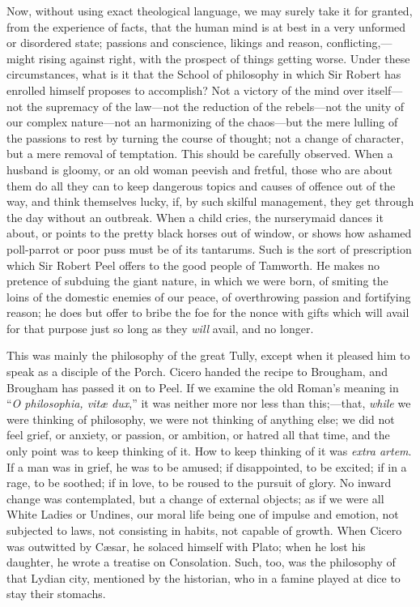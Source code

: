 Now, without using exact theological language, we may surely take
it for granted, from the experience of facts, that the human mind is
at best in a very unformed or disordered state; passions and
conscience, likings and reason, conflicting,—might rising against
right, with the prospect of things getting worse. Under these
circumstances, what is it that the School of philosophy in which
Sir Robert has enrolled himself proposes to accomplish? Not a victory
of the mind over itself—not the supremacy of the law—not the
reduction of the rebels—not the unity of our complex nature—not an
harmonizing of the chaos—but the mere lulling of the passions to
rest by turning the course of thought; not a change of character, but
a mere removal of temptation. This should be carefully observed. When
a husband is gloomy, or an old woman peevish and fretful, those who
are about them do all they can to keep dangerous topics and causes of
offence out of the way, and think themselves lucky, if, by such
skilful management, they get through the day without an outbreak. When
a child cries, the nurserymaid dances it about, or points to the
pretty black horses out of window, or shows how ashamed poll-parrot or
poor puss must be of its tantarums. Such is the sort of prescription
which Sir Robert Peel offers to the good people of Tamworth. He makes
no pretence of subduing the giant nature, in which we were born, of
smiting the loins of the domestic enemies of our peace, of
overthrowing passion and fortifying reason; he does but offer to bribe
the foe for the nonce with gifts which will avail for that purpose
just so long as they \emph{will} avail, and no longer.

This was mainly the philosophy of the great Tully, except when it
pleased him to speak as a disciple of the Porch. Cicero handed the
recipe to Brougham, and Brougham has passed it on to Peel. If we
examine the old Roman's meaning in ``\emph{O philosophia, vitæ dux},''
it was neither more nor less than this;—that, \emph{while} we were
thinking of philosophy, we were not thinking of anything else; we did
not feel grief, or anxiety, or passion, or ambition, or hatred all
that time, and the only point was to keep thinking of it. How to keep
thinking of it was \emph{extra artem}. If a man was in grief, he
was to be amused; if disappointed, to be excited; if in a rage, to be
soothed; if in love, to be roused to the pursuit of glory. No inward
change was contemplated, but a change of external objects; as if we
were all White Ladies or Undines, our moral life being one of impulse
and emotion, not subjected to laws, not consisting in habits, not
capable of growth. When Cicero was outwitted by Cæsar, he solaced
himself with Plato; when he lost his daughter, he wrote a treatise on
Consolation. Such, too, was the philosophy of that Lydian city,
mentioned by the historian, who in a famine played at dice to stay
their stomachs.


